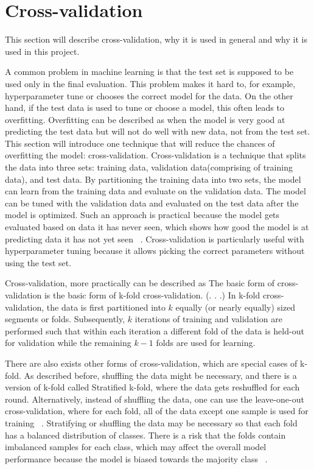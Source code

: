 \section{Cross-validation}\label{sec:cross-validation}

This section will describe cross-validation, why it is used in general and why it is used in this project.

A common problem in machine learning is that the test set is supposed to be used only in the final evaluation. This problem makes it hard to, for example, hyperparameter tune or chooses the correct model for the data. On the other hand, if the test data is used to tune or choose a model, this often leads to overfitting.
Overfitting can be described as when the model is very good at predicting the test data but will not do well with new data, not from the test set. This section will introduce one technique that will reduce the chances of overfitting the model: cross-validation. Cross-validation is a technique that splits the data into three sets: training data, validation data(comprising of training data), and test data. By partitioning the training data into two sets, the model can learn from the training data and evaluate on the validation data. The model can be tuned with the validation data and evaluated on the test data after the model is optimized. Such an approach is practical because the model gets evaluated based on data it has never seen, which shows how good the model is at predicting data it has not yet seen ~\cite{scikit-learn}. Cross-validation is particularly useful with hyperparameter tuning because it allows picking the correct parameters without using the test set. 


Cross-validation, more practically can be described as 
{The basic form of cross-validation is the basic form of k-fold cross-validation. (. . .) In k-fold cross-validation, the data is first partitioned into $k$ equally (or nearly equally) sized segments or folds. Subsequently, $k$ iterations of training and validation are performed such that within each iteration a different fold of the data is held-out for validation while the remaining $k-1$ folds are used for learning.}

There are also exists other forms of cross-validation, which are special cases of k-fold. As described before, shuffling the data might be necessary, and there is a version of k-fold called Stratified k-fold, where the data gets reshuffled for each round. Alternatively, instead of shuffling the data, one can use the leave-one-out cross-validation, where for each fold, all of the data except one sample is used for training ~\cite{Refaeilzadeh2009}. Stratifying or shuffling the data may be necessary so that each fold has a balanced distribution of classes. There is a risk that the folds contain imbalanced samples for each class, which may affect the overall model performance because the model is biased towards the majority class ~\cite{Refaeilzadeh2009}.

